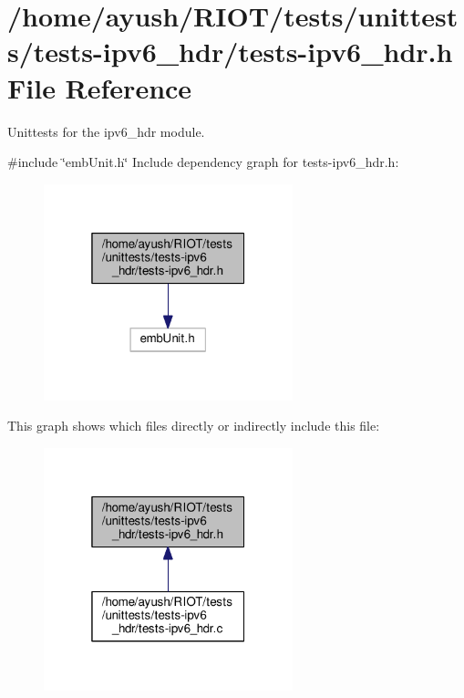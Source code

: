 \hypertarget{tests-ipv6__hdr_8h}{}\section{/home/ayush/\+R\+I\+O\+T/tests/unittests/tests-\/ipv6\+\_\+hdr/tests-\/ipv6\+\_\+hdr.h File Reference}
\label{tests-ipv6__hdr_8h}


Unittests for the {\ttfamily ipv6\+\_\+hdr} module.  


{\ttfamily \#include \char`\"{}emb\+Unit.\+h\char`\"{}}\newline
Include dependency graph for tests-\/ipv6\+\_\+hdr.h\+:
\nopagebreak
\begin{figure}[H]
\begin{center}
\leavevmode
\includegraphics[width=205pt]{tests-ipv6__hdr_8h__incl}
\end{center}
\end{figure}
This graph shows which files directly or indirectly include this file\+:
\nopagebreak
\begin{figure}[H]
\begin{center}
\leavevmode
\includegraphics[width=205pt]{tests-ipv6__hdr_8h__dep__incl}
\end{center}
\end{figure}
